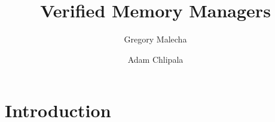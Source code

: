 \documentclass{llncs}%
\begin{document}

\title{Verified Memory Managers}

\author{Gregory Malecha \and Adam Chlipala}

\maketitle

\begin{abstract}

\end{abstract}

\section{Introduction}







\end{document}
